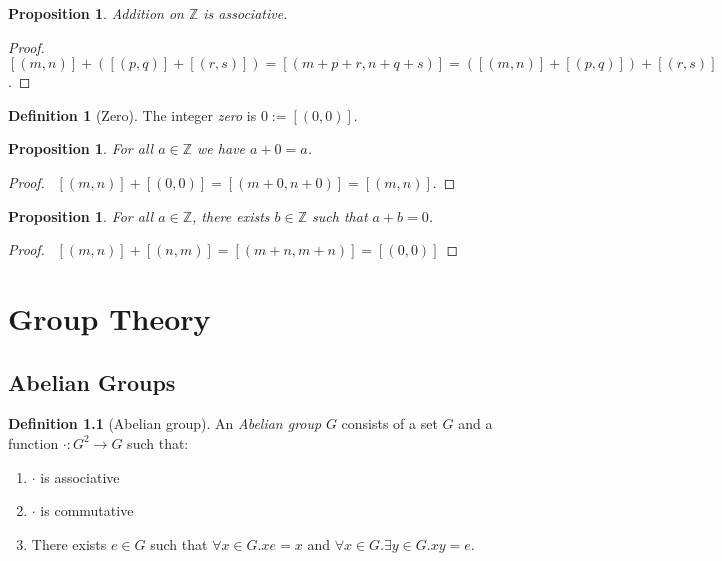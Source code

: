 \documentclass{book}
\let\qed\relax
\newtheorem{prop}[ax]{Proposition}
\theoremstyle{definition}
\newtheorem{df}[ax]{Definition}
\begin{document}
\begin{prop}
\label{prop:plusZassoc}
Addition on $\mathbb{Z}$ is associative.
\end{prop}

\begin{proof}
\pf\ $[(m,n)] + ([(p,q)] + [(r,s)]) = [(m+p+r,n+q+s)] = ([(m,n)] + [(p,q)]) + [(r,s)]$. \qed
\end{proof}

\begin{df}[Zero]
The integer \emph{zero} is $0 := [(0,0)]$.
\end{df}

\begin{prop}
\label{prop:plusZzero}
For all $a \in \mathbb{Z}$ we have $a + 0 = a$.
\end{prop}

\begin{proof}
\pf\ $[(m,n)] + [(0,0)] = [(m+0,n+0)] = [(m,n)]$. \qed
\end{proof}

\begin{prop}
\label{prop:plusZinv}
For all $a \in \mathbb{Z}$, there exists $b \in \mathbb{Z}$ such that $a + b = 0$.
\end{prop}

\begin{proof}
\pf\ $[(m,n)] + [(n,m)] = [(m+n,m+n)] = [(0,0)]$ \qed
\end{proof}

\chapter{Group Theory}

\section{Abelian Groups}

\begin{df}[Abelian group]
An \emph{Abelian group} $G$ consists of a set $G$ and a function $\cdot : G^2 \rightarrow G$ such that:
\begin{enumerate}
\item $\cdot$ is associative
\item $\cdot$ is commutative
\item There exists $e \in G$ such that $\forall x \in G. xe = x$ and $\forall x \in G. \exists y \in G. xy = e$.
\end{enumerate}
\end{df}
\end{document}
